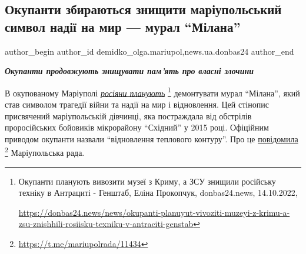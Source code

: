  
 
 
 
 
 
\subsection{Окупанти збираються знищити маріупольський символ надії на мир — мурал \enquote{Мілана}}
\label{sec:22_10_2022.stz.news.ua.donbas24.1.okupanty_zbyrajutsja_znyschyty_mural_milana}
 
\ifcmt
 author_begin
   author_id demidko_olga.mariupol,news.ua.donbas24
 author_end
\fi

\begin{center}
  \em\bfseries\Large
Окупанти продовжують знищувати пам'ять про власні злочини
\end{center}

В окупованому Маріуполі \href{https://donbas24.news/news/okupanti-planuyut-vivoziti-muzeyi-z-krimu-a-zsu-znishhili-rosiisku-texniku-v-antraciti-genstab}{\emph{росіяни планують}}%
\footnote{Окупанти планують вивозити музеї з Криму, а ЗСУ знищили російську техніку в Антрациті - Генштаб, Еліна Прокопчук, donbas24.news, 14.10.2022, \par\url{https://donbas24.news/news/okupanti-planuyut-vivoziti-muzeyi-z-krimu-a-zsu-znishhili-rosiisku-texniku-v-antraciti-genstab}} демонтувати мурал \enquote{Мілана}, який став
символом трагедії війни та надії на мир і відновлення. Цей стінопис присвячений
маріупольській дівчинці, яка постраждала від обстрілів проросійських бойовиків
мікрорайону \enquote{Східний} у 2015 році. Офіційним приводом окупанти назвали
\enquote{відновлення теплового контуру}. Про це \href{https://t.me/mariupolrada/11434}{повідомила}%
\footnote{\url{https://t.me/mariupolrada/11434}} Маріупольська рада.

